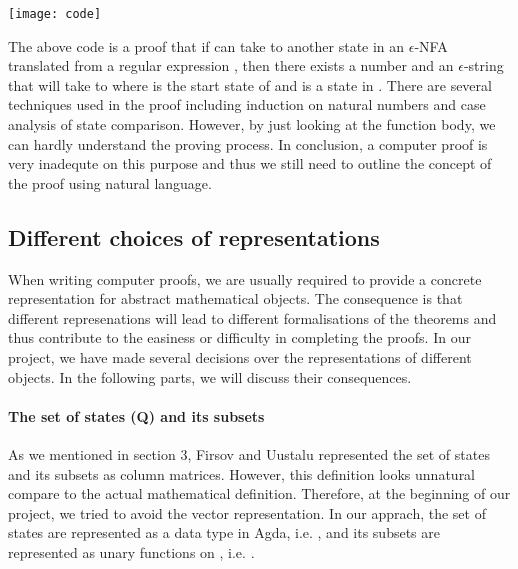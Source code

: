 \begin{center} \texttt{[image: code]} \end{center}

\par The above code is a proof that if  can take  to
another state  in an \(\epsilon\)-NFA translated from a
regular expression , then there exists a number  and
an \(\epsilon\)-string  that will take  to  where
 is the start state of  and  is a state in
. There are several techniques used in the proof including 
induction on natural numbers and case analysis of state comparison. However, by
just looking at the function body, we can hardly understand the
proving process. In conclusion, a computer proof is very inadequte on
this purpose and thus we still need to outline the concept of the proof using natural language. 


\subsection{Different choices of representations}
\par When writing computer proofs, we are usually required to
provide a concrete representation for abstract mathematical
objects. The consequence is that different represenations will lead to different
formalisations of the theorems and thus contribute to the
easiness or difficulty in completing the proofs. In our project, we have
made several decisions over the representations of different objects. In the
following parts, we will discuss their consequences. 

\paragraph{The set of states (Q) and its subsets} As we mentioned in section 3, Firsov and Uustalu
\cite{firsov2013} represented the set of states  and its subsets
as column matrices. However, this definition looks unnatural compare
to the actual mathematical definition. Therefore, at the beginning of
our project, we tried to avoid the vector representation. In our
apprach, the set of states are represented as a data type in Agda, i.e. , and its
subsets are represented as unary functions on , i.e. . 

